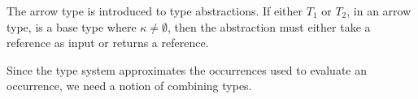 \documentclass{llncs}
\newcommand{\set}[1]{\ensuremath{\{ #1 \}}}
\newcommand{\refc}{\ensuremath{\textrm{ref}\xspace}}
\begin{document}
The arrow type is introduced to type abstractions.
If either $T_1$ or $T_2$, in an arrow type, is a base type where $\kappa \neq \emptyset$,
then the abstraction must either take a reference as input or returns a reference.



Since the type system approximates the occurrences used to evaluate an occurrence, we need a notion of combining types.
\end{document}
